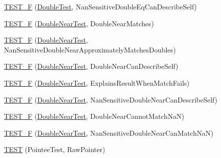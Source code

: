 \begin{DoxyCompactItemize}
\item 
\hyperlink{namespacetesting_1_1gmock__matchers__test_a2d101d1823617f9b1346ee64cdce5216}{T\+E\+S\+T\+\_\+F} (\hyperlink{namespacetesting_1_1gmock__matchers__test_a944cdd366ed240f29ae8e3ebc753ad5c}{Double\+Test}, Nan\+Sensitive\+Double\+Eq\+Can\+Describe\+Self)
\item 
\hyperlink{namespacetesting_1_1gmock__matchers__test_ab2949593472038919b8f3e1b2da204bc}{T\+E\+S\+T\+\_\+F} (\hyperlink{namespacetesting_1_1gmock__matchers__test_aea537d0183ccc65b5c49a75d711993c8}{Double\+Near\+Test}, Double\+Near\+Matches)
\item 
\hyperlink{namespacetesting_1_1gmock__matchers__test_add8765ad2bb98f4b064ee77b4c21a612}{T\+E\+S\+T\+\_\+F} (\hyperlink{namespacetesting_1_1gmock__matchers__test_aea537d0183ccc65b5c49a75d711993c8}{Double\+Near\+Test}, Nan\+Sensitive\+Double\+Near\+Approximately\+Matches\+Doubles)
\item 
\hyperlink{namespacetesting_1_1gmock__matchers__test_a31d14a68cacbaab3fafd26247cc11f9c}{T\+E\+S\+T\+\_\+F} (\hyperlink{namespacetesting_1_1gmock__matchers__test_aea537d0183ccc65b5c49a75d711993c8}{Double\+Near\+Test}, Double\+Near\+Can\+Describe\+Self)
\item 
\hyperlink{namespacetesting_1_1gmock__matchers__test_a4250d3de38128f3452a0a9e93173bdb4}{T\+E\+S\+T\+\_\+F} (\hyperlink{namespacetesting_1_1gmock__matchers__test_aea537d0183ccc65b5c49a75d711993c8}{Double\+Near\+Test}, Explains\+Result\+When\+Match\+Fails)
\item 
\hyperlink{namespacetesting_1_1gmock__matchers__test_ad147bef4b26c0a060cb4d25fe517a3e3}{T\+E\+S\+T\+\_\+F} (\hyperlink{namespacetesting_1_1gmock__matchers__test_aea537d0183ccc65b5c49a75d711993c8}{Double\+Near\+Test}, Nan\+Sensitive\+Double\+Near\+Can\+Describe\+Self)
\item 
\hyperlink{namespacetesting_1_1gmock__matchers__test_a9542b930e1de4d087a8655855edcc13c}{T\+E\+S\+T\+\_\+F} (\hyperlink{namespacetesting_1_1gmock__matchers__test_aea537d0183ccc65b5c49a75d711993c8}{Double\+Near\+Test}, Double\+Near\+Cannot\+Match\+NaN)
\item 
\hyperlink{namespacetesting_1_1gmock__matchers__test_a7c8d850697cb6cc030a4b05eeecffb72}{T\+E\+S\+T\+\_\+F} (\hyperlink{namespacetesting_1_1gmock__matchers__test_aea537d0183ccc65b5c49a75d711993c8}{Double\+Near\+Test}, Nan\+Sensitive\+Double\+Near\+Can\+Match\+NaN)
\item 
\hyperlink{namespacetesting_1_1gmock__matchers__test_ad6a13303d164fa9ca035a137840b78cb}{T\+E\+ST} (Pointee\+Test, Raw\+Pointer)

\end{DoxyCompactItemize}
